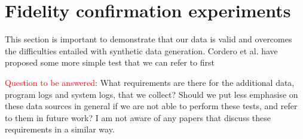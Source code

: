 \documentclass[sigconf]{acmart}
\begin{document}
%
%
%
%
%
%
%
%
%
%
%
%
%


\section{Fidelity confirmation experiments}\label{Sec:Experiments}

This section is important to demonstrate that our data is valid and overcomes the difficulties entailed with synthetic data generation. Cordero et al. have proposed some more simple test that we can refer to first

\textcolor{red}{Question to be answered}: What requirements are there for the additional data, program logs and system logs, that we collect? Should we put less emphasise on these data sources in general if we are not able to perform these tests, and refer to them in future work? I am not aware of any papers that discuss these requirements in a similar way. 
\end{document}

